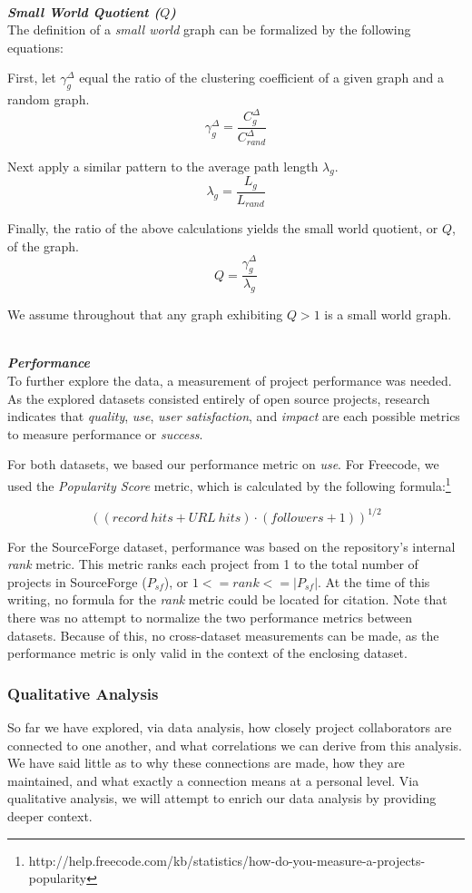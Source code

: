 \documentclass{proc}
\begin{document}
\noindent\\\textit{\textbf{Small World Quotient ($Q$)}}\\
The definition of a \textit{small world} graph can be formalized by the following equations\cite{humphries2008network,uzzi2005collaboration}:

First, let $\gamma^{\Delta}_g$ equal the ratio of the clustering coefficient of a given graph and a random graph.
\[\gamma^{\Delta}_g = \frac{C^{\Delta}_g }{C^{\Delta}_{rand} } \]

Next apply a similar pattern to the average path length $\lambda_g$.
\[\lambda_g = \frac{L_g }{L_{rand} } \]

Finally, the ratio of the above calculations yields the small world quotient, or $Q$, of the graph.
\[Q = \frac{\gamma^{\Delta}_g }{\lambda_g} \]

We assume throughout that any graph exhibiting {$Q > 1$} is a small world graph.

\noindent\\\textit{\textbf{Performance}}\\
To further explore the data, a measurement of project performance was needed. As the explored datasets consisted entirely of open source projects, research indicates that \textit{quality}, \textit{use}, \textit{user satisfaction}, and \textit{impact} are each possible metrics to measure performance or \textit{success}\cite{crowston2003defining}.

For both datasets, we based our performance metric on \textit{use}. For Freecode, we used the \textit{Popularity Score} metric, which is calculated by the following formula:\footnote{http://help.freecode.com/kb/statistics/how-do-you-measure-a-projects-popularity}

\[ ((record\ hits + URL\ hits) \cdot (followers + 1))^{1/2} \]

For the SourceForge dataset, performance was based on the repository's internal \textit{rank} metric. This metric ranks each project from 1 to the total number of projects in SourceForge ($P_{sf}$), or ${1 <= rank <= |P_{sf}|}$. At the time of this writing, no formula for the \textit{rank} metric could be located for citation.  Note that there was no attempt to normalize the two performance metrics between datasets. Because of this, no cross-dataset measurements can be made, as the performance metric is only valid in the context of the enclosing dataset. 

\subsubsection{Qualitative Analysis}
So far we have explored, via data analysis, how closely project collaborators are connected to one another, and what correlations we can derive from this analysis. We have said little as to why these connections are made, how they are maintained, and what exactly a connection means at a personal level. Via qualitative analysis, we will attempt to enrich our data analysis by providing deeper context.
\end{document}
